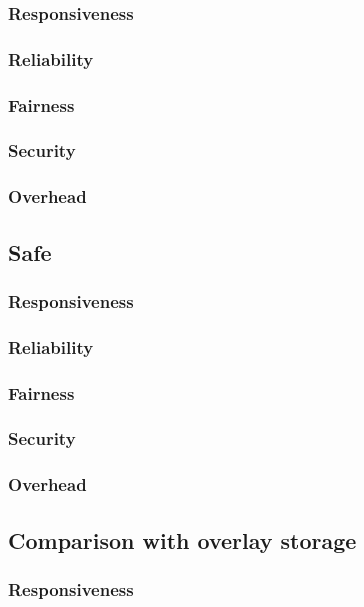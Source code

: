                 \subsubsection{Responsiveness}
                \subsubsection{Reliability}
                \subsubsection{Fairness}
                \subsubsection{Security}
                \subsubsection{Overhead}
            \subsection{Safe}
                \subsubsection{Responsiveness}
                \subsubsection{Reliability}
                \subsubsection{Fairness}
                \subsubsection{Security}
                \subsubsection{Overhead}
            \subsection{Comparison with overlay storage}
                \subsubsection{Responsiveness}
